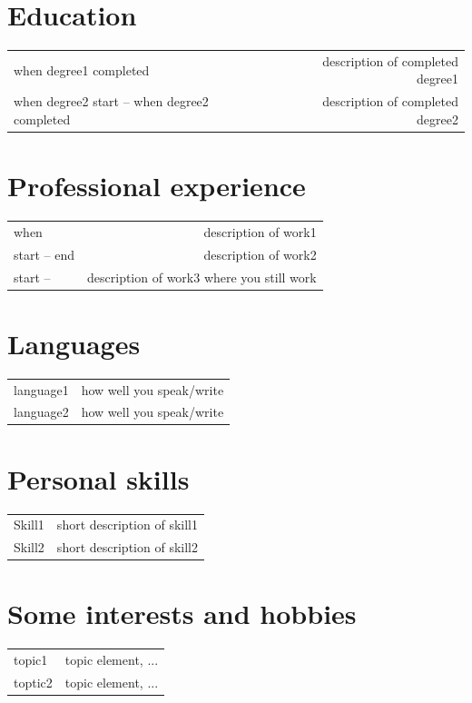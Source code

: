 \documentclass[english,a4paper,11pt]{article}
\begin{document}
\Needspace{\cvneedspaceconst\baselineskip}
\section*{Education}
\begin{longtable}{LR}
when degree1 completed & description of completed degree1
\\ 
when degree2 start -- when degree2 completed & description of completed degree2
\\ 
\end{longtable}

\Needspace{\cvneedspaceconst\baselineskip}
\section*{Professional experience}
\begin{longtable}{LR}
when & description of work1
\\ 
start -- end & description of work2
\\ 
start --  & description of work3 where you still work
\\ 
\end{longtable}

\Needspace{\cvneedspaceconst\baselineskip}
\section*{Languages}
\begin{longtable}{LR}
language1 & how well you speak/write\\ 
language2 & how well you speak/write\\ 
\end{longtable}

\Needspace{\cvneedspaceconst\baselineskip}
\section*{Personal skills}
\begin{longtable}{LR}
Skill1 & short description of skill1
\\ 
Skill2 & short description of skill2
\\ 
\end{longtable}

\Needspace{\cvneedspaceconst\baselineskip}
\section*{Some interests and hobbies}
\begin{longtable}{LR}
topic1 & topic element, ...\\ 
toptic2 & topic element, ...\\ 
\end{longtable}
\end{document}
